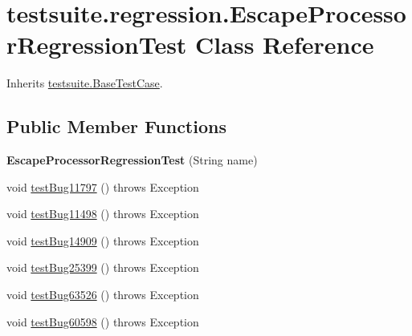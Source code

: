 \hypertarget{classtestsuite_1_1regression_1_1_escape_processor_regression_test}{}\section{testsuite.\+regression.\+Escape\+Processor\+Regression\+Test Class Reference}
\label{classtestsuite_1_1regression_1_1_escape_processor_regression_test}


Inherits \mbox{\hyperlink{classtestsuite_1_1_base_test_case}{testsuite.\+Base\+Test\+Case}}.

\subsection*{Public Member Functions}
\begin{DoxyCompactItemize}
\item 
\mbox{\label{classtestsuite_1_1regression_1_1_escape_processor_regression_test_aa7a16c7210646feaa7dd9843498289f1}} 
{\bfseries Escape\+Processor\+Regression\+Test} (String name)
\item 
void \mbox{\hyperlink{classtestsuite_1_1regression_1_1_escape_processor_regression_test_afce160178129cd6e5455a7da48112250}{test\+Bug11797}} ()  throws Exception 
\item 
void \mbox{\hyperlink{classtestsuite_1_1regression_1_1_escape_processor_regression_test_acee42ee99c924af2e40d07cf935cc3a2}{test\+Bug11498}} ()  throws Exception 
\item 
void \mbox{\hyperlink{classtestsuite_1_1regression_1_1_escape_processor_regression_test_ae70f225ac0aefbe783d3f4a137c0b66d}{test\+Bug14909}} ()  throws Exception 
\item 
void \mbox{\hyperlink{classtestsuite_1_1regression_1_1_escape_processor_regression_test_a807fc950104890375b5291b116c9c45a}{test\+Bug25399}} ()  throws Exception 
\item 
void \mbox{\hyperlink{classtestsuite_1_1regression_1_1_escape_processor_regression_test_a372b0f782e66be889f1351b24530cdc0}{test\+Bug63526}} ()  throws Exception 
\item 
void \mbox{\hyperlink{classtestsuite_1_1regression_1_1_escape_processor_regression_test_a39062afbb30ff8c361ed8fdfaad6f971}{test\+Bug60598}} ()  throws Exception 
\end{DoxyCompactItemize}
